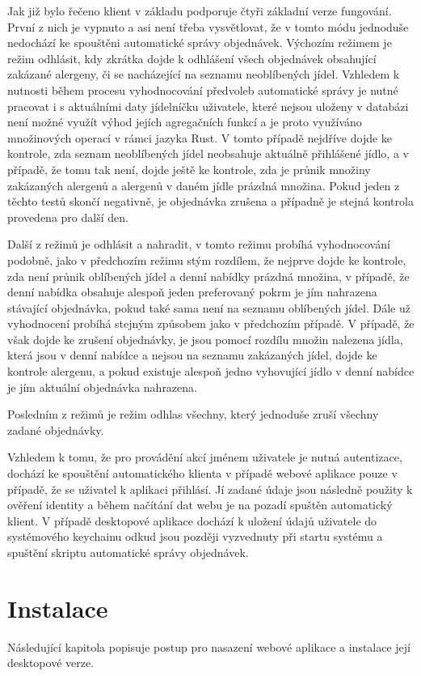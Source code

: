 \documentclass[12pt]{article}
\begin{document}
Jak již bylo řečeno klient v základu podporuje čtyři základní verze fungování. První z nich je vypnuto a asi není třeba vysvětlovat, že v tomto módu jednoduše nedochází ke spouštěni automatické správy objednávek. Výchozím režimem je režim odhlásit, kdy zkrátka dojde k odhlášení všech objednávek obsahující zakázané alergeny, či se nacházející na seznamu neoblíbených jídel. Vzhledem k nutnosti během procesu vyhodnocování předvoleb automatické správy je nutné pracovat i s aktuálními daty jídelníčku uživatele, které nejsou uloženy v databázi není možné využít výhod jejích agregačních funkcí a je proto využíváno množinových operací v rámci jazyka Rust. V tomto případě nejdříve dojde ke kontrole, zda seznam neoblíbených jídel neobsahuje aktuálně přihlášené jídlo, a v případě, že tomu tak není, dojde ještě ke kontrole, zda je průnik množiny zakázaných alergenů a alergenů v daném jídle prázdná množina. Pokud jeden z těchto testů skončí negativně, je objednávka zrušena a případně je stejná kontrola provedena pro další den.

Další z režimů je odhlásit a nahradit, v tomto režimu probíhá vyhodnocování podobně, jako v předchozím režimu stým rozdílem, že nejprve dojde ke kontrole, zda není průnik oblíbených jídel a denní nabídky prázdná množina, v případě, že denní nabídka obsahuje alespoň jeden preferovaný pokrm je jím nahrazena stávající objednávka, pokud také sama není na seznamu oblíbených jídel. Dále už vyhodnocení probíhá stejným způsobem jako v předchozím případě. V případě, že však dojde ke zrušení objednávky, je jsou pomocí rozdílu množin nalezena jídla, která jsou v denní nabídce a nejsou na seznamu zakázaných jídel, dojde ke kontrole alergenu, a pokud existuje alespoň jedno vyhovující jídlo v denní nabídce je jím aktuální objednávka nahrazena.

Posledním z režimů je režim odhlas všechny, který jednoduše zruší všechny zadané objednávky.

Vzhledem k tomu, že pro provádění akcí jménem uživatele je nutná autentizace, dochází ke spouštění automatického klienta v případě webové aplikace pouze v případě, že se uživatel k aplikaci přihlásí. Jí zadané údaje jsou následně použity k ověření identity a během načítání dat webu je na pozadí spuštěn automatický klient. V případě desktopové aplikace dochází k uložení údajů uživatele do systémového keychainu odkud jsou později vyzvednuty při startu systému a spuštění skriptu automatické správy objednávek.
\newpage
\section{Instalace}
Následující kapitola popisuje postup pro nasazení webové aplikace a instalace její desktopové verze.
\end{document}
